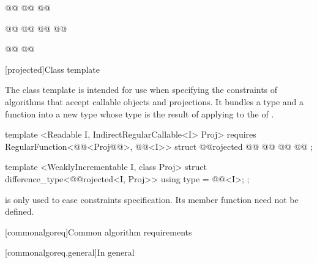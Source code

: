 \begin{addedblock}
\begin{codeblock}
  @@
  @@
    @@

  @@
  @@
  @@
    @@

  @@
  @@
\end{codeblock}

[projected]{Class template }

\pnum
The  class template is intended for use when specifying the constraints of
algorithms that accept callable objects and projections. It bundles a  type
 and a function  into a new  type whose
 type is the result of applying  to the
 of .

%
\begin{codeblock}
  template <Readable I, IndirectRegularCallable<I> Proj>
    requires RegularFunction<@@<Proj@\newtxt{\&}@>, @@<I>>
  struct @@rojected {
    @@
    @@
    @@
    @@
  };

  template <WeaklyIncrementable I, class Proj>
  struct difference_type<@@rojected<I, Proj>> {
    using type = @@<I>;
  };
\end{codeblock}

\pnum
\enternote {} is only used to ease constraints specification. Its
member function need not be defined.\exitnote

[commonalgoreq]{Common algorithm requirements}

[commonalgoreq.general]{In general}


\end{addedblock}
